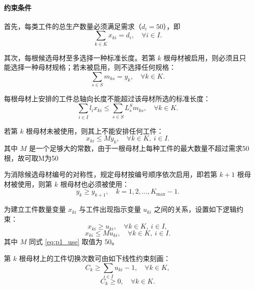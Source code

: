\documentclass[UTF8]{ctexart}
\begin{document}
\paragraph{约束条件}

首先，每类工件的总生产数量必须满足需求（$d_i=50$），即
\begin{equation}
\sum_{k\in K}x_{ki}=d_i,\quad \forall i\in I.
\label{eq:p1_demand}
\end{equation}

其次，每根候选母材至多选择一种标准长度。若第 $k$ 根母材被启用，则必须且只能选择一种母材规格；若未被启用，则不选择任何规格：
\begin{equation}
\sum_{s\in S}m_{ks}=y_k,\quad \forall k\in K.
\label{eq:p1_select}
\end{equation}

每根母材上安排的工件总轴向长度不能超过该母材所选的标准长度：
\begin{equation}
\sum_{i\in I}l_i x_{ki}\leq \sum_{s\in S}L_s^S m_{ks},\quad \forall k\in K.
\label{eq:p1_capacity}
\end{equation}


若第 $k$ 根母材未被使用，则其上不能安排任何工件：
\begin{equation}
x_{ki}\leq M y_k,\quad \forall k\in K,\ i\in I.
\label{eq:p1_use}
\end{equation}
其中 $M$ 是一个足够大的常数，由于一根母材上每种工件的最大数量不超过需求50根，故可取M为50

为消除候选母材编号的对称性，规定母材按编号顺序依次启用，即若第 $k+1$ 根母材被使用，则第 $k$ 根母材也必须被使用：
\begin{equation}
y_k\geq y_{k+1},\quad k=1,2,\ldots,K_{\max}-1.
\label{eq:p1_order}
\end{equation}

为建立工件数量变量 $x_{ki}$ 与工件出现指示变量 $u_{ki}$ 之间的关系，设置如下逻辑约束：
\begin{equation}
x_{ki}\geq u_{ki},\quad \forall k\in K,\ i\in I,
\label{eq:p1_u_lower}
\end{equation}
\begin{equation}
x_{ki}\leq M u_{ki},\quad \forall k\in K,\ i\in I.
\label{eq:p1_u_upper}
\end{equation}
其中 $M$ 同式 \eqref{eq:p1_use} 取值为 50。

第 $k$ 根母材上的工件切换次数可由如下线性约束刻画：
\begin{equation}
C_k\geq \sum_{i\in I}u_{ki}-1,\quad \forall k\in K,
\label{eq:p1_switch1}
\end{equation}
\begin{equation}
C_k\geq 0,\quad \forall k\in K.
\label{eq:p1_switch2}
\end{equation}
\end{document}
